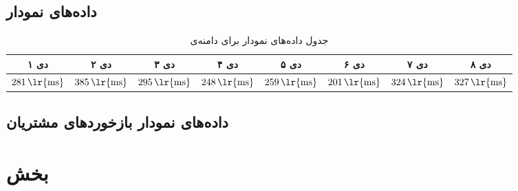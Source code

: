 \documentclass[11pt, oneside]{book}
\begin{document}
\subsection{داده‌های نمودار }
\begin{table}[H]
\begin{center}
\caption{جدول داده‌های نمودار  برای دامنه‌ی }
\begin{adjustbox}{width=\textwidth}
\begin{tabular}{|c|c|c|c|c|c|c|c|}
\hline
۱ دی  &
۲ دی  &
۳ دی  &
۴ دی  &
۵ دی  &
۶ دی  &
۷ دی  &
۸ دی \\
\hline
\hline
$281 \, \text{\lr{ms}}$ &
$385 \, \text{\lr{ms}}$ &
$295 \, \text{\lr{ms}}$ &
$248 \, \text{\lr{ms}}$ &
$259 \, \text{\lr{ms}}$ &
$201 \, \text{\lr{ms}}$ &
$324 \, \text{\lr{ms}}$ &
$327 \, \text{\lr{ms}}$ \\
\hline
\end{tabular}
\end{adjustbox}
\end{center}
\end{table}

\subsection{داده‌های نمودار بازخورد‌های مشتریان}
\section{بخش }

\listoftables
\end{document}
